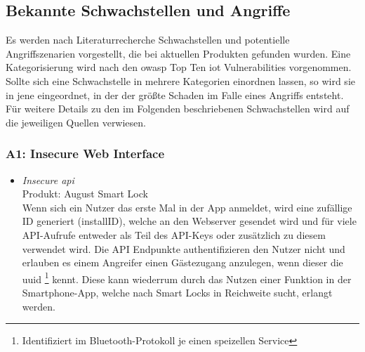 \subsection{Bekannte Schwachstellen und Angriffe}
\label{sec:analysis_vulns}
    Es werden nach Literaturrecherche Schwachstellen und potentielle Angriffszenarien vorgestellt, die bei aktuellen Produkten gefunden wurden. 
    Eine Kategorisierung wird nach den \gls{owasp} Top Ten \gls{iot} Vulnerabilities\cite{Miessler2015} vorgenommen. 
    Sollte sich eine Schwachstelle in mehrere Kategorien einordnen lassen, so wird sie in jene eingeordnet, in der der größte Schaden im Falle eines Angriffs entsteht. 
    Für weitere Details zu den im Folgenden beschriebenen Schwachstellen wird auf die jeweiligen Quellen verwiesen.
    
    \subsubsection*{A1: Insecure Web Interface}
       \begin{itemize}[leftmargin=0cm,label={}]
            \item \emph{Insecure \gls{api}}\cite{Fuller2017,Lariviere2015}\label{vuln:userenum}\\
                Produkt: August Smart Lock\\
                Wenn sich ein Nutzer das erste Mal in der App anmeldet, wird eine zufällige ID generiert (installID), welche an den Webserver gesendet wird und für viele API-Aufrufe entweder als Teil des API-Keys oder zusätzlich zu diesem verwendet wird. 
                Die API Endpunkte authentifizieren den Nutzer nicht und erlauben es einem Angreifer einen Gästezugang anzulegen, wenn dieser die \gls{uuid}
                \!\footnote{Identifiziert im Bluetooth-Protokoll je einen speizellen Service}
                kennt.
                Diese kann wiederrum durch das Nutzen einer Funktion in der Smartphone-App, welche nach Smart Locks in Reichweite sucht, erlangt werden. 
       \end{itemize} 
       
